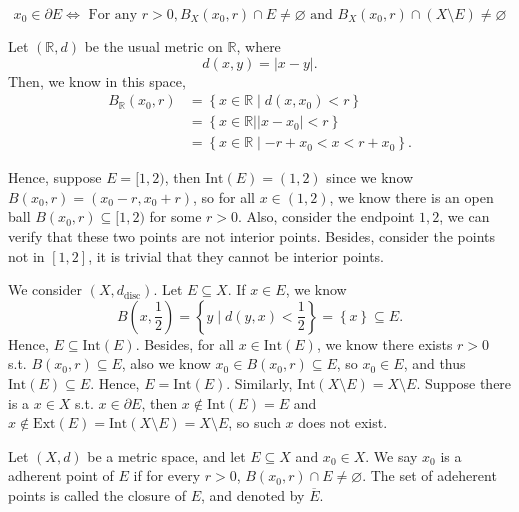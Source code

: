 \begin{proposition}
    \[
        x_0 \in \partial E \iff \text{ For any } r > 0, B_X(x_0, r) \cap E \neq \varnothing \text{ and } B_X(x_0, r) \cap (X \setminus E) \neq \varnothing 
    \]
\end{proposition}

\begin{eg}
    Let \((\mathbb{R} , d)\) be the usual metric on \(\mathbb{R} \), where 
    \[
        d(x,y) = \vert x-y \vert. 
    \]  
    Then, we know in this space,
    \begin{align*}
        B_\mathbb{R} (x_0, r) &= \left\{ x \in \mathbb{R} \mid d(x, x_0) < r \right\} \\
        &= \left\{ x \in \mathbb{R} \mid \vert x - x_0 \vert < r \right\} \\
        &= \left\{ x \in \mathbb{R} \mid -r + x_0 < x < r + x_0 \right\}.
    \end{align*}

    Hence, suppose \(E = [1, 2)\), then \(\mathrm{Int}(E) = (1,2) \) since we know \(B(x_0, r) = (x_0 - r, x_0 + r)\), so for all \(x \in (1,2)\), we know there is an open ball \(B(x_0, r) \subseteq [1, 2)\) for some \(r > 0\). Also, consider the endpoint \(1,2\), we can verify that these two points are not interior points. Besides, consider the points not in \([1, 2]\), it is trivial that they cannot be interior points.  
\end{eg}

\begin{eg}
    We consider \((X, d_{\text{disc}})\). Let \(E \subseteq X\). If \(x \in E\), we know 
    \[
        B\left( x, \frac{1}{2} \right) = \left\{ y \mid d(y,x) < \frac{1}{2} \right\} = \left\{ x \right\} \subseteq E.  
    \]   
    Hence, \(E \subseteq  \mathrm{Int}(E)  \).  Besides, for all \(x \in \mathrm{Int}(E) \), we know there exists \(r > 0\) s.t. \(B(x_0, r) \subseteq E\), also we know \(x_0 \in B(x_0, r) \subseteq E\), so \(x_0 \in E\), and thus \(\mathrm{Int}(E) \subseteq E \). Hence, \(E = \mathrm{Int}(E) \).  Similarly, \(\mathrm{Int}(X \setminus E) = X \setminus E\).  Suppose there is a \(x \in X\) s.t. \(x \in \partial E\), then \(x \notin \mathrm{Int}(E) = E\) and \(x \notin \mathrm{Ext}(E) = \mathrm{Int}(X \setminus E) = X \setminus E\), so such \(x\) does not exist.    
\end{eg}

\begin{definition}[Closure] \label{def: closure}
    Let \((X, d)\) be a metric space, and let \(E \subseteq X\) and \(x_0 \in X\). We say \(x_0\) is a adherent point of \(E\) if for every \(r > 0\), \(B(x_0, r) \cap E \neq \varnothing \). The set of adeherent points is called the closure of \(E\), and denoted by \(\overline{E} \).        
\end{definition}

